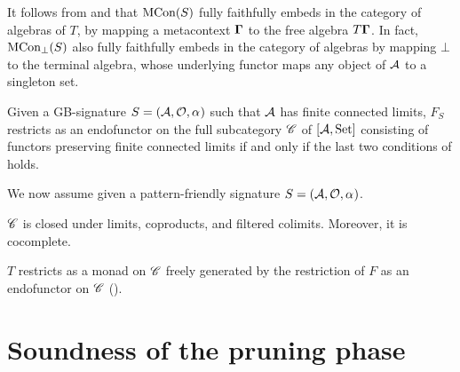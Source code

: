 \begin{full}
\begin{remark}
It follows from  and \citet[Exercise VI.5.1][]{MacLane:cwm}
that $\Th S$ fully faithfully embeds in the category of algebras
of $T$, by mapping a metacontext $\dotmcontext{\Gamma}$ to the free
algebra $T\dotmcontext{\Gamma}$. In fact, $\Thbot S$ also fully
faithfully embeds in the category of algebras by mapping $\bot$ to
the terminal algebra, whose underlying functor maps any object of
${\cal A}$ to a singleton set.
\end{remark}
\end{full}
\begin{lemma}
\label{lem:res-F}Given a GB-signature $S=({\cal A},\indexedO,\ntharvecfunct)$
such that ${\cal A}$ has finite connected limits, $F_{S}$ restricts
as an endofunctor on the full subcategory $\C$ of $[{\cal A},\Set]$
consisting of functors preserving finite connected limits if and only
if the last two conditions of  holds.
\end{lemma}
We now assume given a pattern-friendly signature $S=({\cal A},\indexedO,\ntharvecfunct)$.
\begin{lemma}
\label{lem:lims-coprod-pw}$\C$ is closed under limits, coproducts,
and filtered colimits. Moreover, it is cocomplete.
\end{lemma}
\begin{corollary}
\label{cor:-T-res}$T$ restricts as a monad on $\C$ freely generated
by the restriction of $F$ as an endofunctor on $\C$ ().
\end{corollary}

\section{Soundness of the pruning phase}

